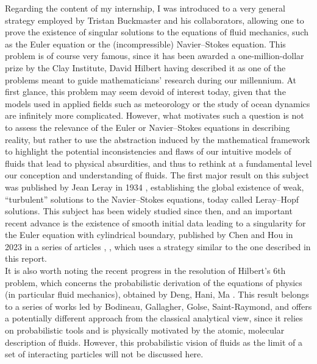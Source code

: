 \documentclass[11pt,a4paper]{article}
\begin{document}
\hspace*{2em} Regarding the content of my internship, I was introduced to a very general strategy employed by Tristan Buckmaster and his collaborators, allowing one to prove the existence of singular solutions to the equations of fluid mechanics, such as the Euler equation or the (incompressible) Navier–Stokes equation. This problem is of course very famous, since it has been awarded a one-million-dollar prize by the Clay Institute, David Hilbert having described it as one of the problems meant to guide mathematicians’ research during our millennium. At first glance, this problem may seem devoid of interest today, given that the models used in applied fields such as meteorology or the study of ocean dynamics are infinitely more complicated. However, what motivates such a question is not to assess the relevance of the Euler or Navier–Stokes equations in describing reality, but rather to use the abstraction induced by the mathematical framework to highlight the potential inconsistencies and flaws of our intuitive models of fluids that lead to physical absurdities, and thus to rethink at a fundamental level our conception and understanding of fluids. The first major result on this subject was published by Jean Leray in 1934 \cite{leray1934}, establishing the global existence of weak, “turbulent” solutions to the Navier–Stokes equations, today called Leray–Hopf solutions. This subject has been widely studied since then, and an important recent advance is the existence of smooth initial data leading to a singularity for the Euler equation with cylindrical boundary, published by Chen and Hou in 2023 in a series of articles \cite{chen_hou1}, \cite{chen_hou2}, which uses a strategy similar to the one described in this report. \\
\hspace*{2em} It is also worth noting the recent progress in the resolution of Hilbert’s 6th problem, which concerns the probabilistic derivation of the equations of physics (in particular fluid mechanics), obtained by Deng, Hani, Ma \cite{deng_hani_ma_2025_hilbert6}. This result belongs to a series of works led by Bodineau, Gallagher, Golse, Saint-Raymond, and offers a potentially different approach from the classical analytical view, since it relies on probabilistic tools and is physically motivated by the atomic, molecular description of fluids. However, this probabilistic vision of fluids as the limit of a set of interacting particles will not be discussed here. \\
\end{document}
